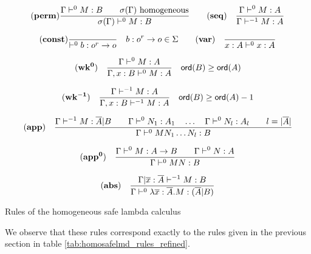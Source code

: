 \begin{table}[htbp]
$$  \mathbf{(perm)} {
      { \Gamma \vdash^0 M:B \qquad \sigma(\Gamma)  } \hbox{ homogeneous}
    \over
      { \sigma(\Gamma) \vdash^0 M : B }
    }
\qquad \mathbf{(seq)} \quad \frac{\displaystyle \Gamma \vdash^{0} M : A}{\Gamma
\vdash^{-1} M : A}
$$

$$
 \mathbf{(const)}
    { \over { \vdash^0 b : o^r \rightarrow o}} \quad b : o^r \rightarrow o \in \Sigma
\qquad
 \mathbf{(var)} \quad  \frac{\displaystyle }{x : A\vdash^{0} x : A} $$

$$ \mathbf{(wk^{0})} \quad  \frac{\displaystyle \Gamma \vdash^{0} M : A}{\Gamma , x : B \vdash^{0} M : A} \quad {\sf ord}(B) \geq {\sf ord}(A) $$

$$ \mathbf{(wk^{-1})} \quad  \frac{\displaystyle \Gamma \vdash^{-1} M : A}{\Gamma , x : B \vdash^{-1} M : A} \quad {\sf ord}(B) \geq {\sf ord}(A) -1$$

$$ \mathbf{(app)} \quad  \frac{\displaystyle \Gamma \vdash^{-1} M : \overline{A} | B
                                        \qquad \Gamma \vdash^{0} N_1 : A_1
                                        \quad \ldots \quad \Gamma \vdash^{0} N_l : A_l
                                        \qquad l = |\overline{A}|
                                        }{\Gamma  \vdash^{0} M N_1 \ldots N_l : B}
$$


$$ \mathbf{(app^0)} \quad  \frac{\displaystyle \Gamma \vdash^0 M : A\rightarrow B
                                        \qquad \Gamma \vdash^{0} N : A
                                   }{\Gamma  \vdash^{0} M N : B}$$

$$ \mathbf{(abs)} \quad  \frac{\displaystyle \Gamma| \overline{x} : \overline{A} \vdash^{-1} M : B}{\Gamma  \vdash^{0} \lambda \overline{x} : \overline{A} . M : (\overline{A}|B)}$$
\caption{Rules of the homogeneous safe lambda calculus}
\label{tab:homosafelmd_rules}
\end{table}


We observe that these rules correspond exactly to the rules given in the previous section
in table \ref{tab:homosafelmd_rules_refined}.
